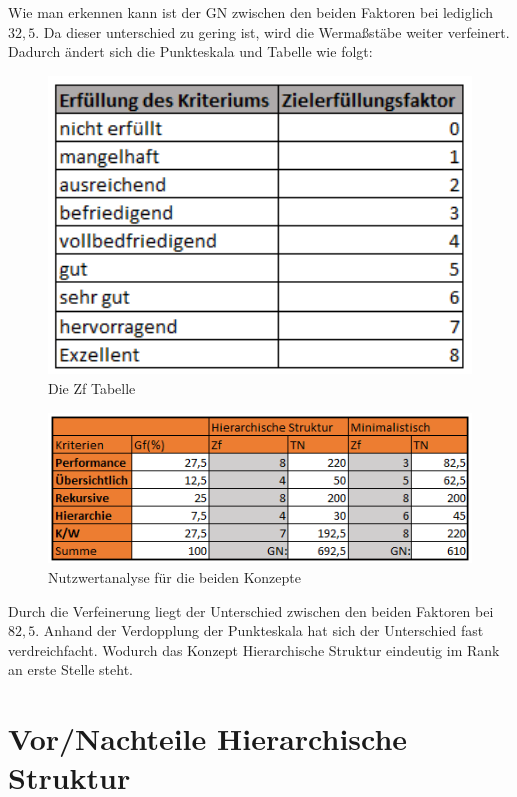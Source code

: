 Wie man erkennen kann ist der \ac{GN} zwischen den beiden Faktoren bei lediglich $32,5$.
Da dieser unterschied zu gering ist, wird die Wermaßstäbe weiter verfeinert.
Dadurch ändert sich die Punkteskala und Tabelle wie folgt:
\begin{figure}[h!]
 \centering
 \includegraphics[width=1\textwidth]{gfx/Picture/Ziel2.PNG}
 \caption{Die Zf Tabelle}
 \label{fig:Ziel}
\end{figure}
\newpage
\begin{figure}[h!]
 \centering
 \includegraphics[width=1\textwidth]{gfx/Picture/Nutzwert2.PNG}
 \caption{Nutzwertanalyse für die beiden Konzepte}
 \label{fig:Nutz}
\end{figure}
Durch die Verfeinerung liegt der Unterschied zwischen den beiden Faktoren bei $82,5$.
Anhand der Verdopplung der Punkteskala hat sich der Unterschied fast verdreichfacht.
Wodurch das Konzept Hierarchische Struktur eindeutig im Rank an erste Stelle steht.

\section{Vor/Nachteile Hierarchische Struktur}
\label{sec:chapter05:Hierarchische}


